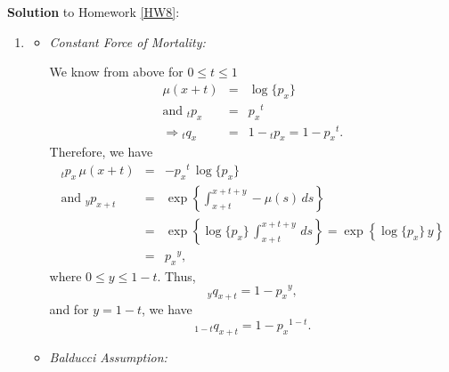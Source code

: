 \documentclass[11pt,fleqn,oneside]{book}
\begin{document}
\noindent \textbf{Solution} to Homework \ref{HW8}:
\footnotesize 
\begin{enumerate}
\item
\begin{itemize}
\item \textit{Constant Force of Mortality:}

We know from above for $0\leq t \leq 1$
\begin{eqnarray*}
\mu(x+t) &=& \log\{p_x\} \\
\text{and } {_tp_x}&=& {p_x}^t \\
\Rightarrow {_tq_x} &=& 1 - {_tp_x} = 1 - {p_x}^t.
\end{eqnarray*}
Therefore, we have
\begin{eqnarray*}
{_tp_x}\,\mu(x+t) &=& -{p_x}^t \, \log\{p_x\} \\ 
\text{and } {_{y}p_{x+t}} & =& \exp\left\{\int_{x+t}^{x+t+y}-\mu(s)\,ds\right\}\\
&=& \exp\left\{\log\{p_x\}\,\int_{x+t}^{x+t+y}\,ds\right\} = \exp\left\{\log\{p_x\}\,y\right\}\\
&=& {p_x}^{y},
\end{eqnarray*}
where $0\leq y \leq 1-t$. Thus,
$$
{_yq_{x+t}} = 1 - {p_x}^y,
$$
and for $y=1-t$, we have
$$
{_{1-t}q_{x+t}} = 1 - {p_x}^{1-t}.
$$

\item \textit{Balducci Assumption:}


\end{itemize}
\end{enumerate}
\end{document}
